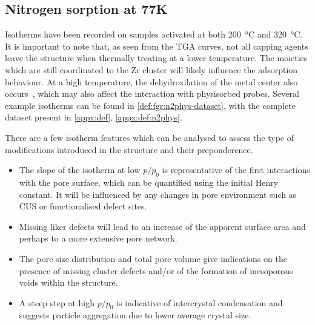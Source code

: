 
\subsection{Nitrogen sorption at 77K}

Isotherms have been recorded on samples activated at both
\SI{200}{\degreeCelsius} and \SI{320}{\degreeCelsius}.
It is important to note that, as seen from the TGA curves,
not all capping agents leave the structure when thermally treating
at a lower temperature. The moieties which are still coordinated
to the Zr cluster will likely influence the adsorption
behaviour. At a high temperature, the dehydroxilation of the 
metal center also occurs~\cite{valenzanoDisclosingComplexStructure2011},
which may also affect the interaction with physisorbed probes. 
Several example isotherms can be found in
\autoref{def:fgr:n2phys-dataset}, with the complete dataset
present in \autoref{appx:def}, \autoref{appx:def:n2phys}.

There are a few isotherm features which can be analysed to
assess the type of modifications introduced in the structure
and their preponderence.

\begin{itemize}
	\item The slope of the isotherm at low \(p/p_0\) is representative
	      of the first interactions with the pore surface, which can be
	      quantified using the initial Henry constant. It will be influenced
		  by any changes in pore environment such as CUS or functionalised
		  defect sites.
	\item Missing liker defects will lead to an increase of the
	      apparent surface area and perhaps to a more extensive
	      pore network.
	\item The pore size distribution and total pore volume give
	      indications on the presence of missing cluster defects and/or
	      of the formation of mesoporous voids within the structure.
	\item A steep step at high \(p/p_0\) is indicative of intercrystal
	      condensation and suggests particle aggregation due to lower average
	      crystal size.
\end{itemize}

